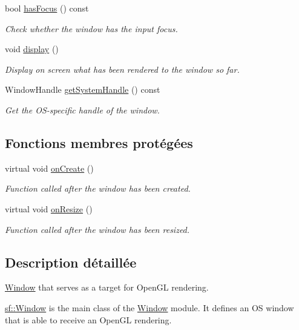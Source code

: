 \begin{DoxyCompactItemize}
bool \hyperlink{classsf_1_1Window_ad8db2e6500d13ca9396281296404ba31}{has\+Focus} () const
\begin{DoxyCompactList}\small\item\em Check whether the window has the input focus. \end{DoxyCompactList}\item 
void \hyperlink{classsf_1_1Window_adabf839cb103ac96cfc82f781638772a}{display} ()
\begin{DoxyCompactList}\small\item\em Display on screen what has been rendered to the window so far. \end{DoxyCompactList}\item 
Window\+Handle \hyperlink{classsf_1_1Window_ad2fa6be5104ec0bfe79af7a5f524ea90}{get\+System\+Handle} () const
\begin{DoxyCompactList}\small\item\em Get the O\+S-\/specific handle of the window. \end{DoxyCompactList}\end{DoxyCompactItemize}
\subsection*{Fonctions membres protégées}
\begin{DoxyCompactItemize}
\item 
virtual void \hyperlink{classsf_1_1Window_a106633b9be49b27f83d4712689b493eb}{on\+Create} ()
\begin{DoxyCompactList}\small\item\em Function called after the window has been created. \end{DoxyCompactList}\item 
virtual void \hyperlink{classsf_1_1Window_a10f567a387da7b49f417f73321fcf64d}{on\+Resize} ()
\begin{DoxyCompactList}\small\item\em Function called after the window has been resized. \end{DoxyCompactList}\end{DoxyCompactItemize}


\subsection{Description détaillée}
\hyperlink{classsf_1_1Window}{Window} that serves as a target for Open\+GL rendering. 

\hyperlink{classsf_1_1Window}{sf\+::\+Window} is the main class of the \hyperlink{classsf_1_1Window}{Window} module. It defines an OS window that is able to receive an Open\+GL rendering.

